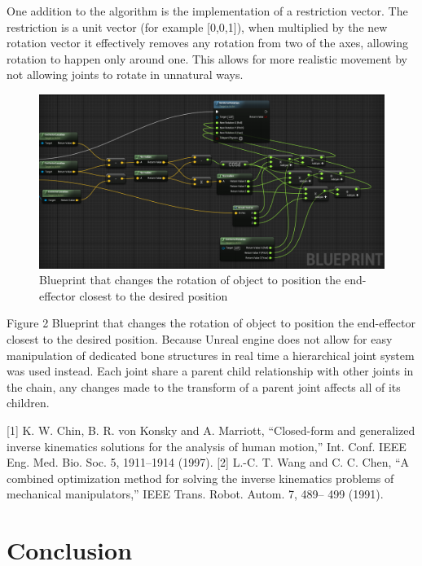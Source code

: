 \documentclass[paper=a4, fontsize=11pt]{scrartcl} %
\numberwithin{equation}{section} %
\numberwithin{figure}{section} %
\numberwithin{table}{section} %
\begin{document}
One addition to the algorithm is the implementation of a restriction vector. The restriction is a unit vector (for example [0,0,1]), when multiplied by the new rotation vector it effectively removes any rotation from two of the axes, allowing rotation to happen only around one. This allows for more realistic movement by not allowing joints to rotate in unnatural ways.
 \begin{figure}[h]
 \centering
 \includegraphics[scale=1]{CCDBlueprint.png}
 \caption{Blueprint that changes the rotation of object to position the end-effector closest to the desired position}
 \end{figure}
 
Figure 2 Blueprint that changes the rotation of object to position the end-effector closest to the desired position.
Because Unreal engine does not allow for easy manipulation of dedicated bone structures in real time a hierarchical joint system was used instead. Each joint share a parent child relationship with other joints in the chain, any changes made to the transform of a parent joint affects all of its children.


[1] K. W. Chin, B. R. von Konsky and A. Marriott, “Closed-form and generalized inverse kinematics solutions for the analysis of human motion,” Int. Conf. IEEE Eng. Med. Bio. Soc. 5, 1911–1914 (1997).
[2] L.-C. T. Wang and C. C. Chen, “A combined optimization method for solving the inverse kinematics problems of mechanical manipulators,” IEEE Trans. Robot. Autom. 7, 489– 499 (1991).



\section{Conclusion}
\end{document}

